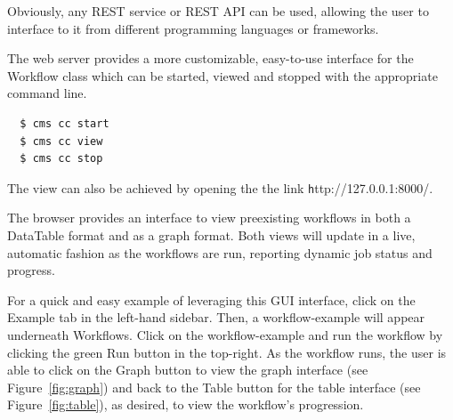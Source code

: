 Obviously, any REST service or REST API can be used, allowing the user
to interface to it from different programming languages or frameworks.

The web server provides a more customizable, easy-to-use interface for
the Workflow class which can be started, viewed and stopped with the
appropriate command line.

\begin{verbatim}
  $ cms cc start
  $ cms cc view
  $ cms cc stop
\end{verbatim}

The view can also be achieved by opening the 
the link {\scriptsize\texttt http://127.0.0.1:8000/}.

The browser provides an interface to view preexisting workflows in
both a DataTable format and as a graph format. Both views will update
in a live, automatic fashion as the workflows are run, reporting
dynamic job status and progress.

For a quick and easy example of leveraging this GUI interface, click
on the Example tab in the left-hand sidebar. Then, a workflow-example
will appear underneath Workflows. Click on the workflow-example and
run the workflow by clicking the green Run button in the top-right. As
the workflow runs, the user is able to click on the Graph button to
view the graph interface (see Figure~\ref{fig:graph}) and back to the
Table button for the table interface (see Figure~\ref{fig:table}), as
desired, to view the workflow's progression.


